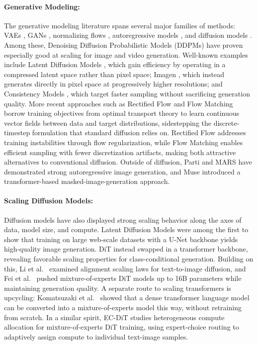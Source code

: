 \documentclass[manuscript,screen,review]{acmart}
\begin{document}
    \paragraph{Generative Modeling: } The generative modeling literature spans several major families of methods:
VAEs \citep{kingma2013auto}, GANs \citep{goodfellow2014generative}, normalizing flows \citep{rezende2015variational},
autoregressive models \citep{vandenOord2016pixel}, and diffusion models \citep{sohl2015deep,ho2020denoising}. Among these, Denoising Diffusion Probabilistic Models (DDPMs) \citep{ho2020denoising}
have proven especially good at scaling for image and video generation. Well-known examples
include Latent Diffusion Models \citep{rombach2022high}, which gain efficiency by operating in a compressed
latent space rather than pixel space; Imagen \citep{saharia2022photorealistic}, which instead generates directly in
pixel space at progressively higher resolutions; and Consistency Models \citep{song2023consistency}, which target
faster sampling without sacrificing generation quality. More recent approaches such as Rectified Flow \citep{liu2022rectified} and Flow Matching \citep{lipman2023flow} borrow training objectives from optimal
transport theory to learn continuous vector fields between data and target distributions, sidestepping
the discrete-timestep formulation that standard diffusion relies on. Rectified Flow addresses training
instabilities through flow regularization, while Flow Matching enables efficient sampling with fewer
discretization artifacts, making both attractive alternatives to conventional diffusion. Outside of
diffusion, Parti \citep{yu2022scaling} and MARS \citep{he2024mars} have demonstrated strong autoregressive image
generation, and Muse \citep{chang2023muse} introduced a transformer-based masked-image-generation approach.

\paragraph{\textbf{Scaling Diffusion Models:}} Diffusion models have also displayed strong scaling behavior along the axes
of data, model size, and compute. Latent Diffusion Models \citep{rombach2022high} were among the first to
show that training on large web-scale datasets with a U-Net backbone yields high-quality image
generation. DiT \citep{peebles2023scalable} instead swapped in a transformer backbone, revealing favorable scaling
properties for class-conditional generation. Building on this, Li et al.\ \citep{li2024scalability} examined alignment
scaling laws for text-to-image diffusion, and Fei et al.\ \citep{fei2024scalinga} pushed mixture-of-experts DiT models
up to 16B parameters while maintaining generation quality. A separate route to scaling transformers
is upcycling: Komatsuzaki et al.\ \citep{komatsuzaki2022sparse} showed that a dense transformer language model can
be converted into a mixture-of-experts model this way, without retraining from scratch. In a similar
spirit, EC-DiT \citep{sun2024ec} studies heterogeneous compute allocation for mixture-of-experts DiT
training, using expert-choice routing to adaptively assign compute to individual text-image samples.
\end{document}
